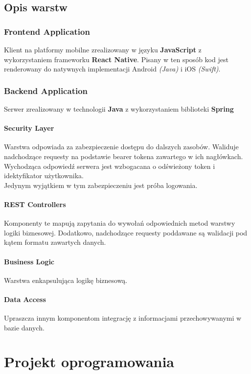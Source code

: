 \documentclass{scrreprt}
\begin{document}
\section{Opis warstw}
\subsection{Frontend Application}
Klient na platformy mobilne zrealizowany w języku \textbf{JavaScript} z wykorzystaniem frameworku \textbf{React Native}.
Pisany w ten sposób kod jest renderowany do natywnych implementacji Android \textit{(Java)} i iOS \textit{(Swift)}.

\subsection{Backend Application}
Serwer zrealizowany w technologii \textbf{Java} z wykorzystaniem biblioteki \textbf{Spring}

\subsubsection{Security Layer}
Warstwa odpowiada za zabezpieczenie dostępu do dalszych zasobów. 
Waliduje nadchodzące requesty na podstawie bearer tokena zawartego w ich nagłówkach.
Wychodząca odpowiedź serwera jest wzbogacana o odświeżony token i idektyfikator użytkownika.\\
Jedynym wyjątkiem w tym zabezpieczeniu jest próba logowania.

\subsubsection{REST Controllers}
Komponenty te mapują zapytania do wywołań odpowiednich metod warstwy logiki biznesowej. 
Dodatkowo, nadchodzące requesty poddawane są walidacji pod kątem formatu zawartych danych.

\subsubsection{Business Logic}
Warstwa enkapsulująca logikę biznesową.

\subsubsection{Data Access}
Upraszcza innym komponentom integrację z informacjami przechowywanymi w bazie danych. 


\chapter{Projekt oprogramowania}
\end{document}
